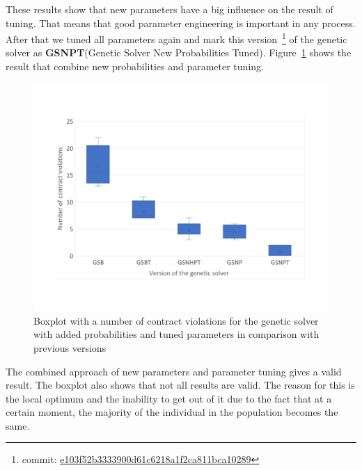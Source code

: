 These results show that new parameters have a big influence on the result of tuning. That means that good parameter engineering is important in any process.
After that we tuned all parameters again and mark this version~\footnote{commit: \href{https://git-st.inf.tu-dresden.de/mquat/mquat2/commit/e103f52b3333900d61c6218a1f2ca811bca10289}{e103f52b3333900d61c6218a1f2ca811bca10289}} of the genetic solver as \textbf{GSNPT}(Genetic Solver New Probabilities Tuned).
Figure~\ref{fig:boxplotsolverNewParametersTuning} shows the result that combine new probabilities and parameter tuning.
\begin{figure}
	\centering
	\includegraphics[width=\textwidth]{images/BoxPlotSolverNewParametersTuning.pdf}
	\caption[Boxplot with a number of contract violations for the genetic solver with added probabilities and tuned parameters in comparison with previous versions]{Boxplot with a number of contract violations for the genetic solver with added probabilities and tuned parameters in comparison with previous versions}
	\label{fig:boxplotsolverNewParametersTuning}
\end{figure}

The combined approach of new parameters and parameter tuning gives a valid result. The boxplot also shows that not all results are valid. The reason for this is the local optimum and the inability to get out of it due to the fact that at a certain moment, the majority of the individual in the population becomes the same. 

